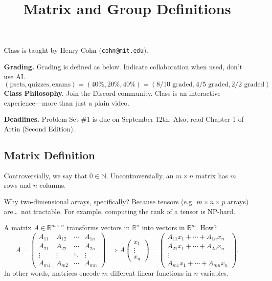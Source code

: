 \title{Matrix and Group Definitions}



Class is taught by Henry Cohn (\texttt{cohn@mit.edu}).

\textbf{Grading.} Grading is defined as below.  Indicate collaboration when used, don't use AI.
\[ (\text{psets}, \text{quizzes}, \text{exams}) = (40\%, 20\%, 40\%) = (8/10 \text{ graded}, 4/5 \text{ graded}, 2/2 \text{ graded}) \]
\textbf{Class Philosophy.} Join the Discord community.  Class is an interactive experience---more than just a plain video.

\textbf{Deadlines.} Problem Set \#1 is due on September 12th.  Also, read Chapter 1 of Artin (Second Edition).

\subsection{Matrix Definition}

Controversially, we say that $0 \in \mathbb{N}$.  Uncontroversially, an $m \times n$ matrix has $m$ rows and $n$ columns.

\begin{remark}
Why two-dimensional arrays, specifically?  Because tensors (e.g. $m \times n \times p$ arrays) are\dots \ not tractable.  For example, computing the rank of a tensor is NP-hard.
\end{remark}

A matrix $A \in \mathbb{R}^{m \times n}$ transforms vectors in $\mathbb{R}^n$ into vectors in $\mathbb{R}^m$.  How?
\[ A = \begin{pmatrix} A_{11} & A_{12} & \cdots & A_{1n} \\ A_{21} & A_{22} & \cdots & A_{2n} \\ \vdots & \vdots & \ddots & \vdots \\ A_{m1} & A_{m2} & \cdots & A_{mn} \end{pmatrix} \implies A\begin{pmatrix} x_1 \\ \vdots \\ x_n \end{pmatrix} = \begin{pmatrix} A_{11}x_1 + \cdots + A_{1n} x_n \\ A_{21}x_1 + \cdots + A_{2n}x_n \\ \vdots \\ A_{m1}x_1 + \cdots + A_{mn}x_n \end{pmatrix}. \]
In other words, matrices encode $m$ different linear functions in $n$ variables.

